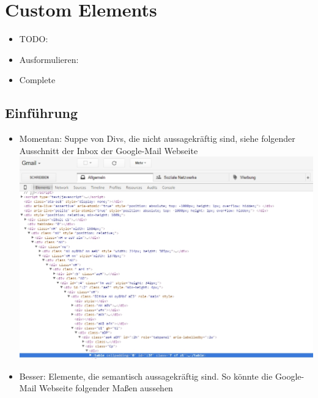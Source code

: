 \section{Custom Elements}\label{custom-elements}

\begin{itemize}
\item
  TODO:
\item
  Ausformulieren:
\item
  Complete
\end{itemize}

\subsection{Einführung}\label{einfuxfchrung}

\begin{itemize}
\tightlist
\item
  Momentan: Suppe von Divs, die nicht aussagekräftig sind, siehe
  folgender Ausschnitt der Inbox der Google-Mail Webseite
  \includegraphics{images/1-custom-elements-div-suppe.jpg}
\item
  Besser: Elemente, die semantisch aussagekräftig sind. So könnte die
  Google-Mail Webseite folgender Maßen aussehen
\end{itemize}

\begin{Shaded}
\begin{Highlighting}[]
  \KeywordTok{>}
\KeywordTok{>}
\end{Highlighting}
\end{Shaded}

